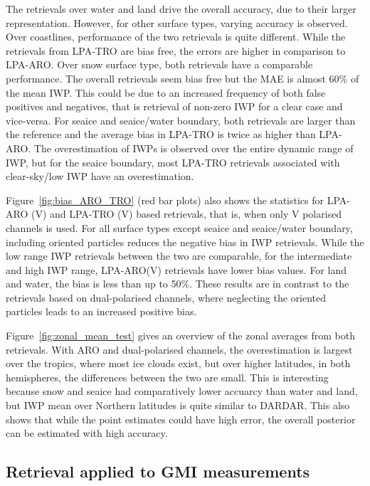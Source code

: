 \documentclass[amt, manuscript]{copernicus}
\begin{document}
The retrievals over water and land drive the overall accuracy, due to their larger representation. However, for other surface types, varying accuracy is observed. Over coastlines, performance of the two retrievals is quite different. While the retrievals from LPA-TRO are bias free, the errors are higher in comparison to LPA-ARO. Over snow surface type, both retrievals have a comparable performance. The overall retrievals seem bias free but the MAE is almost 60\% of the mean IWP. This could be due to an increased frequency of both false positives and negatives, that is retrieval of non-zero IWP for a clear case and vice-versa. For seaice and seaice/water boundary, both retrievals are larger than the reference and the average bias in LPA-TRO is twice as higher than LPA-ARO. The overestimation of IWPs is observed over the entire dynamic range of IWP, but for the seaice boundary, most LPA-TRO retrievals associated with clear-sky/low IWP have an overestimation.

Figure~\ref{fig:bias_ARO_TRO} (red bar plots) also shows the statistics for LPA-ARO (V) and LPA-TRO (V) based retrievals, that is, when only V polarised channels is used. For all surface types except seaice and seaice/water boundary, including oriented particles reduces the negative bias in IWP retrievals. While the low range IWP retrievals between the two are comparable, for the intermediate and high IWP range, LPA-ARO(V) retrievals have lower bias values. For land and water, the bias is less than up to 50\%. These results are in contrast to the retrievals based on dual-polarised channels, where neglecting the oriented particles leads to an increased positive bias.


Figure~\ref{fig:zonal_mean_test} gives an overview of the zonal averages from both retrievals. With ARO and dual-polarised channels, the overestimation is largest over the tropics, where most ice clouds exist, but over higher latitudes, in both hemispheres, the differences between the two are small. This is interesting because snow and seaice had comparatively lower accuarcy than water and land, but IWP mean over Northern latitudes is quite similar to DARDAR. This also shows that while the point estimates could have high error, the overall posterior can be estimated with high accuracy. 



\subsection{Retrieval applied to GMI measurements}
\label{sec:IWP_GMI}
\end{document}
